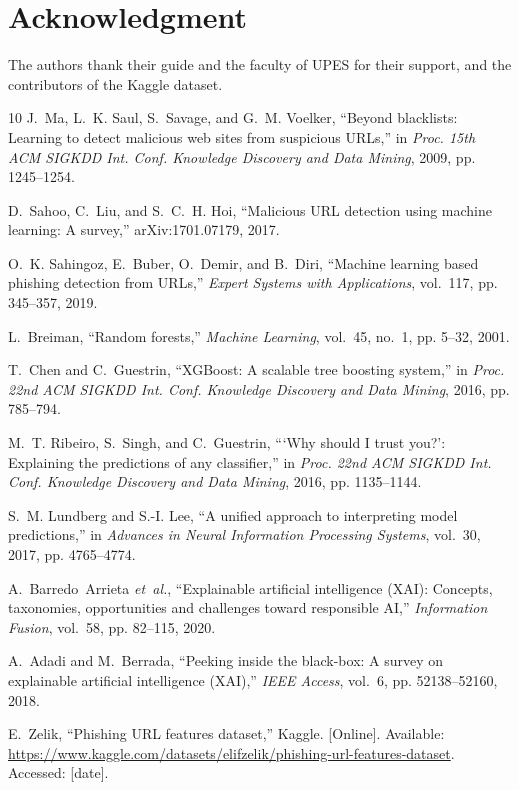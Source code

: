\documentclass[journal]{IEEEtran}
\begin{document}
\section*{Acknowledgment}
The authors thank their guide and the faculty of UPES for their support, and the contributors of the Kaggle dataset.

\begin{thebibliography}{10}
J.~Ma, L.~K. Saul, S.~Savage, and G.~M. Voelker, ``Beyond blacklists: Learning to detect malicious web sites from suspicious {URLs},'' in \emph{Proc. 15th ACM SIGKDD Int. Conf. Knowledge Discovery and Data Mining}, 2009, pp. 1245--1254.

D.~Sahoo, C.~Liu, and S.~C.~H. Hoi, ``Malicious {URL} detection using machine learning: A survey,'' arXiv:1701.07179, 2017.

O.~K. Sahingoz, E.~Buber, O.~Demir, and B.~Diri, ``Machine learning based phishing detection from {URLs},'' \emph{Expert Systems with Applications}, vol.~117, pp. 345--357, 2019.

L.~Breiman, ``Random forests,'' \emph{Machine Learning}, vol.~45, no.~1, pp. 5--32, 2001.

T.~Chen and C.~Guestrin, ``{XGBoost}: A scalable tree boosting system,'' in \emph{Proc. 22nd ACM SIGKDD Int. Conf. Knowledge Discovery and Data Mining}, 2016, pp. 785--794.

M.~T. Ribeiro, S.~Singh, and C.~Guestrin, ```Why should {I} trust you?': Explaining the predictions of any classifier,'' in \emph{Proc. 22nd ACM SIGKDD Int. Conf. Knowledge Discovery and Data Mining}, 2016, pp. 1135--1144.

S.~M. Lundberg and S.-I. Lee, ``A unified approach to interpreting model predictions,'' in \emph{Advances in Neural Information Processing Systems}, vol.~30, 2017, pp. 4765--4774.

A.~Barredo~Arrieta \emph{et~al.}, ``Explainable artificial intelligence ({XAI}): Concepts, taxonomies, opportunities and challenges toward responsible {AI},'' \emph{Information Fusion}, vol.~58, pp. 82--115, 2020.

A.~Adadi and M.~Berrada, ``Peeking inside the black-box: A survey on explainable artificial intelligence ({XAI}),'' \emph{IEEE Access}, vol.~6, pp. 52138--52160, 2018.

E.~Zelik, ``Phishing {URL} features dataset,'' Kaggle. [Online]. Available: \url{https://www.kaggle.com/datasets/elifzelik/phishing-url-features-dataset}. Accessed: [date].
\end{thebibliography}
\end{document}
